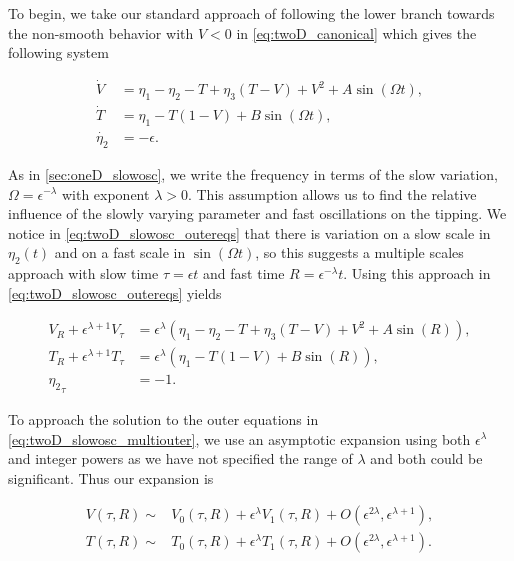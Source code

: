 To begin, we take our standard approach of following the lower branch towards the non-smooth behavior with $V<0$ in \eqref{eq:twoD_canonical} which gives the following system 

\begin{equation}\label{eq:twoD_slowosc_outereqs}
 \begin{aligned}
  \dot{V} & = \eta_1-\eta_2-T+\eta_3(T-V)+V^2+A\sin(\Omega t), \\
  \dot{T} & = \eta_1-T(1-V)+B\sin(\Omega t), \\
 \dot{\eta_2} & = -\epsilon.
 \end{aligned}
\end{equation}

As in \autoref{sec:oneD_slowosc}, we write the frequency in terms of the slow variation, $\Omega = \epsilon^{-\lambda}$ with exponent $\lambda>0$. This assumption allows us to find the relative influence of the slowly varying parameter and fast oscillations on the tipping. We notice in \eqref{eq:twoD_slowosc_outereqs} that there is variation on a slow scale in $\eta_2(t)$ and on a fast scale in $\sin(\Omega t)$, so this suggests a multiple scales approach with slow time $\tau = \epsilon t$ and fast time $R=\epsilon^{-\lambda}t$. Using this approach in \eqref{eq:twoD_slowosc_outereqs} yields

\begin{equation}\label{eq:twoD_slowosc_multiouter}
 \begin{aligned}
V_R+\epsilon^{\lambda+1}V_\tau & = \epsilon^{\lambda} \left(\eta_1-\eta_2-		T+\eta_3(T-V)+V^2+A\sin(R)\right), \\
T_R+\epsilon^{\lambda+1}T_\tau & = \epsilon^{\lambda}\left( \eta_1-T(1-		 V)+B\sin(R)\right), \\
	{\eta_2}_\tau & = -1.
\end{aligned}
\end{equation}
 
To approach the solution to the outer equations in \eqref{eq:twoD_slowosc_multiouter}, we use an asymptotic expansion using both $\epsilon^\lambda$ and integer powers as we have not specified the range of $\lambda$ and both could be significant. Thus our expansion is

\begin{equation}\label{eq:twoD_slowosc_outerexpansion}
	\begin{aligned}
		V(\tau,R)\sim& V_0(\tau,R)+\epsilon^\lambda 	V_1(\tau,R)+O(\epsilon^{2\lambda},\epsilon^{\lambda+1}),\\
    T(\tau,R)\sim& T_0(\tau,R)+\epsilon^\lambda T_1(\tau,R)+O(\epsilon^{2\lambda},\epsilon^{\lambda+1}).
	\end{aligned}
\end{equation}

